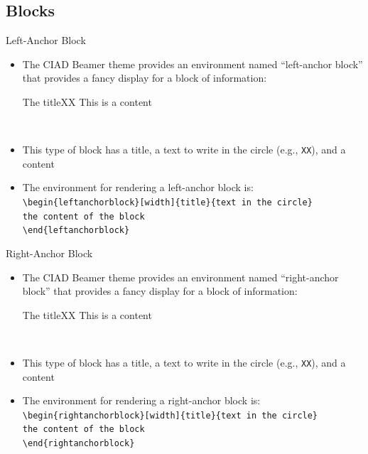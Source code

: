 \documentclass[english,sectioncirclenumberstyle]{ciadbeamer}
\begin{document}
\subsection{Blocks}
\tableofcontentslide[sectionstyle={show/shaded},subsectionstyle={show/shaded/hide},subsubsectionstyle={hide/hide/hide/hide},sections={3-}]

\begin{frame}{Left-Anchor Block}
	\begin{itemize}
		\item The CIAD Beamer theme provides an environment named ``left-anchor block'' that provides a fancy display for a block of information: \\[.25cm]
			\begin{leftanchorblock}{The title}{XX}
				This is a content
			\end{leftanchorblock} \\[.5cm]
		\item This type of block has a title, a text to write in the circle (e.g., \texttt{XX}), and a content
		\item The environment for rendering a left-anchor block is: \\[.25cm]
			\texttt{{\textbackslash}begin\{leftanchorblock\}[width]\{title\}\{text in the circle\}} \\
			\mbox{}\hspace{.2cm}\texttt{the content of the block} \\
			\texttt{{\textbackslash}end\{leftanchorblock\}}
	\end{itemize}
\end{frame}

\begin{frame}{Right-Anchor Block}
	\begin{itemize}
		\item The CIAD Beamer theme provides an environment named ``right-anchor block'' that provides a fancy display for a block of information: \\[.25cm]
		\begin{rightanchorblock}{The title}{XX}
			This is a content
		\end{rightanchorblock} \\[.5cm]
		\item This type of block has a title, a text to write in the circle (e.g., \texttt{XX}), and a content
		\item The environment for rendering a right-anchor block is: \\[.25cm]
		\texttt{{\textbackslash}begin\{rightanchorblock\}[width]\{title\}\{text in the circle\}} \\
		\mbox{}\hspace{.2cm}\texttt{the content of the block} \\
		\texttt{{\textbackslash}end\{rightanchorblock\}}
	\end{itemize}
\end{frame}
\end{document}
